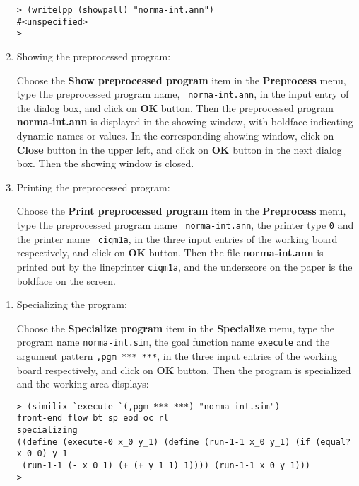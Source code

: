\begin{sloppypar}
\begin{enumerate}
\begin{verbatim}
> (writelpp (showpall) "norma-int.ann")
#<unspecified>
>
\end{verbatim}

\item Showing the preprocessed program:

    Choose the {\bf Show preprocessed program} item in the {\bf
Preprocess} menu, type the preprocessed program name, {\tt
norma-int.ann}, in the input entry of the dialog box, and click on
{\bf OK} button.  Then the preprocessed program {\bf norma-int.ann} is
displayed in the showing window, with boldface indicating dynamic
names or values. In the corresponding showing window, click on {\bf
Close} button in the upper left, and click on {\bf OK} button in the
next dialog box. Then the showing window is closed.

\item Printing the preprocessed program:

    Choose the {\bf Print preprocessed program} item in the {\bf
Preprocess} menu, type the preprocessed program name {\tt
norma-int.ann}, the printer type {\tt 0} and the printer name {\tt
ciqm1a}, in the three input entries of the working board respectively,
and click on {\bf OK} button. Then the file {\bf norma-int.ann} is
printed out by the lineprinter {\tt ciqm1a}, and the underscore on the
paper is the boldface on the screen.
\end{enumerate}


\begin{enumerate}
\item Specializing the program:

    Choose the {\bf Specialize program} item in the {\bf Specialize}
menu, type the program name {\tt norma-int.sim}, the goal function
name {\tt execute} and the argument pattern {\tt ,pgm *** ***}, in the
three input entries of the working board respectively, and click on
{\bf OK} button. Then the program is specialized and the working area
displays:

\begin{verbatim}
> (similix `execute `(,pgm *** ***) "norma-int.sim")
front-end flow bt sp eod oc rl
specializing
((define (execute-0 x_0 y_1) (define (run-1-1 x_0 y_1) (if (equal? x_0 0) y_1
 (run-1-1 (- x_0 1) (+ (+ y_1 1) 1)))) (run-1-1 x_0 y_1)))
>
\end{verbatim}
\end{enumerate}


\end{sloppypar}
